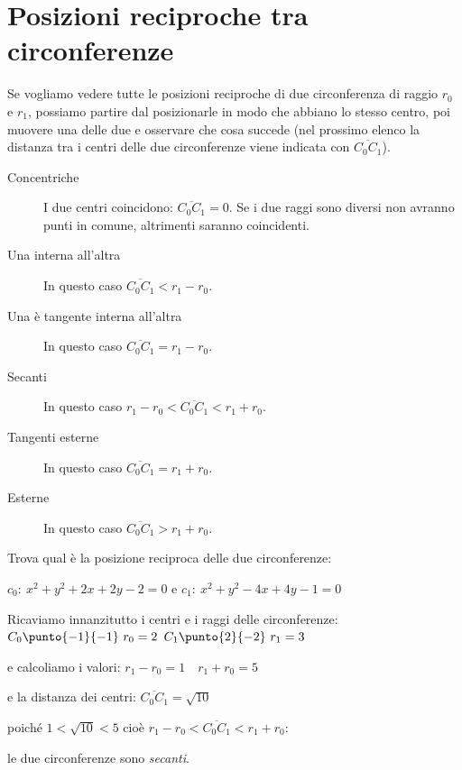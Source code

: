 \section{Posizioni reciproche tra circonferenze}
\label{sec:circ_posizionireciproche}

Se vogliamo vedere tutte le posizioni reciproche di due circonferenza  
di raggio \(r_0\) e \(r_1\), possiamo partire dal posizionarle in modo che 
abbiano lo stesso centro, poi muovere una delle due e osservare che cosa 
succede (nel prossimo elenco la distanza tra i centri delle due circonferenze 
viene indicata con \(\overline{C_0 C_1}\)).

\begin{description} %
 \item [Concentriche]
I due centri coincidono: \(\overline{C_0 C_1} = 0\).
Se i due raggi sono diversi non avranno punti in comune, altrimenti saranno 
coincidenti.
 \item [Una interna all'altra]
In questo caso \(\overline{C_0 C_1} < r_1 - r_0\).
 \item [Una è tangente interna all'altra]
In questo caso \(\overline{C_0 C_1} = r_1 - r_0\).
 \item [Secanti]
In questo caso \(r_1 - r_0 < \overline{C_0 C_1} < r_1 + r_0\).
 \item [Tangenti esterne]
In questo caso \(\overline{C_0 C_1} = r_1 + r_0\).
 \item [Esterne]
In questo caso \(\overline{C_0 C_1} > r_1 + r_0\).
\end{description}


\begin{esempio}
Trova qual è la posizione reciproca delle due circonferenze:

\(c_0:~x^2 + y^2 +2x +2y -2 = 0\) e \(c_1:~x^2 + y^2 -4x +4y -1 = 0\) 

Ricaviamo innanzitutto i centri e i raggi delle circonferenze: \\
\(C_0 \punto{-1}{-1} ~ r_0 = 2\) \qquad 
\(C_1 \punto{2}{-2} ~ r_1 = 3\) 

e calcoliamo i valori: \quad \(r_1 - r_0 = 1 \quad r_1 + r_0 = 5\) 

e la distanza dei centri: \quad \(\overline{C_0 C_1} = \sqrt{10}\) 

poiché \quad \(1 < \sqrt{10} < 5\) cioè \quad 
\(r_1 - r_0 < \overline{C_0 C_1} < r_1 + r_0\): 

le due circonferenze sono \emph{secanti}.
\end{esempio}


